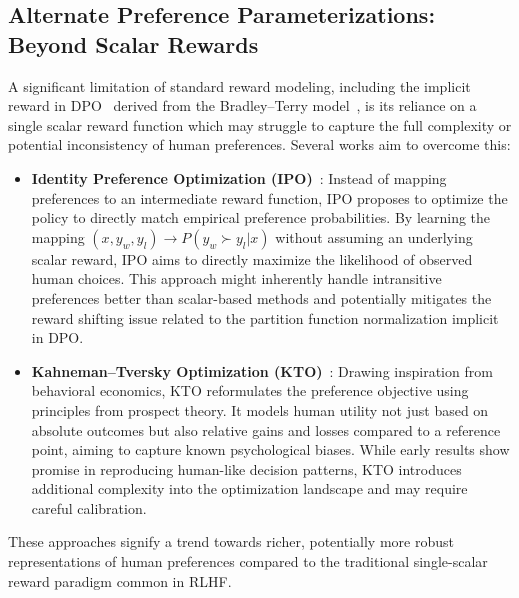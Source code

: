 \documentclass[a4paper,oneside,10pt,ngerman,english]{scrartcl}
\begin{document}
\subsection{Alternate Preference Parameterizations: Beyond Scalar Rewards}
A significant limitation of standard reward modeling, including the implicit reward in DPO~\cite{bib:rafailov2023direct} derived from the Bradley--Terry model~\cite{bib:bradley1952rank}, is its reliance on a single scalar reward function which may struggle to capture the full complexity or potential inconsistency of human preferences. Several works aim to overcome this:
\begin{itemize}
    \item \textbf{Identity Preference Optimization (IPO)}~\cite{bib:azar2023ipo}: Instead of mapping preferences to an intermediate reward function, IPO proposes to optimize the policy to directly match empirical preference probabilities. By learning the mapping \( (x, y_w, y_l) \rightarrow P(y_w \succ y_l | x) \) without assuming an underlying scalar reward, IPO aims to directly maximize the likelihood of observed human choices. This approach might inherently handle intransitive preferences better than scalar-based methods and potentially mitigates the reward shifting issue related to the partition function normalization implicit in DPO.
    \item \textbf{Kahneman--Tversky Optimization (KTO)}~\cite{bib:ethayarajh2024kto}: Drawing inspiration from behavioral economics, KTO reformulates the preference objective using principles from prospect theory. It models human utility not just based on absolute outcomes but also relative gains and losses compared to a reference point, aiming to capture known psychological biases. While early results show promise in reproducing human-like decision patterns, KTO introduces additional complexity into the optimization landscape and may require careful calibration.
\end{itemize}
These approaches signify a trend towards richer, potentially more robust representations of human preferences compared to the traditional single-scalar reward paradigm common in RLHF.
\end{document}
